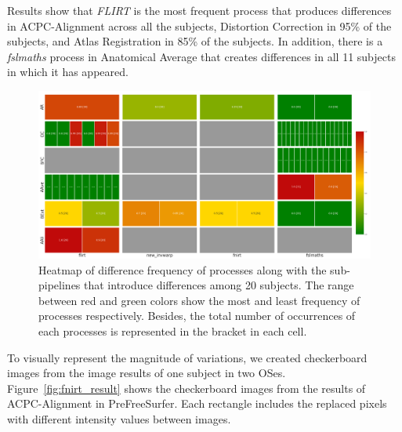\documentclass[a4paper,num-refs]{oup-contemporary}
\begin{document}
Results show that \emph{FLIRT} is the most frequent process that produces 
differences in ACPC-Alignment across all the subjects, Distortion Correction 
in 95\% of the subjects, and Atlas Registration in 85\% of the subjects. 
In addition, there is a \emph{fslmaths} process in Anatomical Average that 
creates differences in all 11 subjects in which it has appeared.


\begin{figure}
\centering
  \includegraphics[width=\columnwidth]{images/pfs_heatmap.png}
  \caption{Heatmap of difference frequency of processes along with the sub-pipelines that introduce 
           differences among 20 subjects. The range between red and green colors show the most and 
           least frequency of processes respectively. Besides, the total number 
           of occurrences of each processes is represented in the bracket in each cell.}
  \label{fig:pfs_freq}
\end{figure}

To visually represent the magnitude of variations, we created checkerboard 
images from the image results of one subject in two OSes. Figure~\ref{fig:fnirt_result} 
shows the checkerboard images from the results of ACPC-Alignment in PreFreeSurfer. 
Each rectangle includes the replaced pixels with different intensity values between images.

\end{document}
